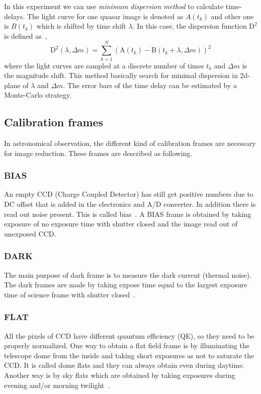 \noindent
In this experiment we can use \textit{minimum dispersion method} to calculate time-delays. The light curve for one quasar image is denoted as $ A(t_{k}) $ and other one is $ B(t_{k}) $ which is shifted by time shift $ \lambda $. In this case, the dispersion function $ \text{D}^2 $ is defined as~\cite{manual},
\begin{equation}
\text{D}^2(\lambda, \Delta m)=\sum_{k=1}^{N}(\text{A}(t_{k}) - \text{B}(t_{k}+\lambda, \Delta m) )^2
\label{math:disp}
\end{equation}
where the light curves are sampled at a discrete number of times $ t_{k}$ and $\Delta m$ is the magnitude shift. This method basically search for minimal dispersion in $2$d-plane of $\lambda$ and $\Delta m$.
The error bars of the time delay can be estimated by a Monte-Carlo strategy.


\subsection{Calibration frames}
In astronomical observation, the different kind of calibration frames are necessary for image reduction. These frames are described as following.

\subsubsection{BIAS}
An empty CCD (Charge Coupled Detector) has still get positive numbers due to DC offset that is added in the electronics and A/D converter. In addition there is read out noise present. This is called bias~\cite{manual}. 
A BIAS frame is obtained by taking exposure of no exposure time with shutter closed and the image read out of unexposed CCD. 

\subsubsection{DARK}
The main purpose of dark frame is to measure the dark current (thermal noise). The dark frames are made by taking expose time equal to the largest exposure time of science frame with shutter closed~\cite{manual}. 

\subsubsection{FLAT}
All the pixels of CCD have different quantum efficiency (QE), so they need to be properly normalized. One way to obtain a flat field frame is by illuminating the telescope dome from the inside and taking short exposures as not to saturate the CCD. It is called dome flats and they can always obtain even during daytime. Another way is by sky flats which are obtained by taking exposures during evening and/or morning twilight~\cite{manual}. 

